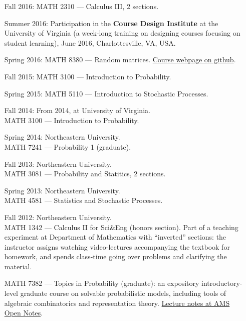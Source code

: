 \documentclass[letterpaper,11pt]{article}
\begin{document}
\begin{itemize}
\item[Fall 2016:]
	MATH 2310 --- Calculus III, 2 sections.

\item[Summer 2016:] Participation in the \textbf{Course Design Institute} at the University of Virginia (a week-long training on designing courses focusing on student learning), June 2016, Charlottesville, VA, USA.

\item[Spring 2016:]
	MATH 8380 --- Random matrices. \href{https://github.com/lenis2000/RMT_Spring_2016}{Course webpage on github}.

\item[Fall 2015:]
	MATH 3100 --- Introduction to Probability.

\item[Spring 2015:]
	MATH 5110 --- Introduction to Stochastic Processes.

	\item
	      [Fall 2014:]
	      From 2014, at University of Virginia. \\ MATH 3100 --- Introduction to
	      Probability.

	\item
	      [Spring 2014:]
	      Northeastern University. \\ MATH 7241 --- Probability 1
	      (graduate).

	\item
	      [Fall 2013:]
	      Northeastern University. \\ MATH 3081 --- Probability and
	      Statitics, 2 sections.
	\item
	      [Spring 2013:]
	      Northeastern University. \\ MATH 4581 --- Statistics and
	      Stochastic Processes.
	\item
	      [Fall 2012:]
	      Northeastern University. \\ MATH 1342 --- Calculus II for
	      Sci\&Eng (honors section). Part of a teaching experiment at Department of
	      Mathematics with ``inverted'' sections: the instructor assigns watching
	      video-lectures accompanying the textbook for homework, and spends class-time
	      going over problems and clarifying the material.

	      MATH 7382 --- Topics in Probability (graduate): an expository
	      introductory-level graduate course on solvable probabilistic models, including
	      tools of algebraic combinatorics and representation theory.
		  \href{https://www.ams.org/open-math-notes/omn-view-listing?listingId=110813}{Lecture notes at AMS Open Notes}.


\end{itemize}
\end{document}
